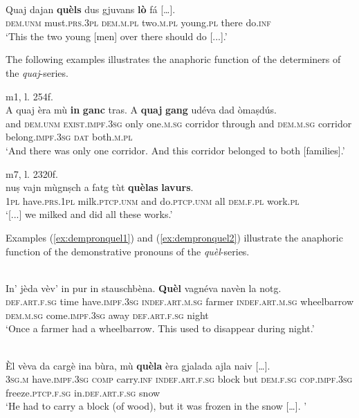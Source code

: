 \ea
\label{ex:quaj:anaph2}
\\
\gll Quaj dajan \textbf{quèls} dus gjuvans \textbf{lò} fá […].\\
    \textsc{dem.unm} must.\textsc{prs.3pl} \textsc{dem.m.pl} two.\textsc{m.pl} young.\textsc{pl} there do.\textsc{inf}\\
\glt `This the two young [men] over there should do [...].'
\z

The following examples illustrates the anaphoric function of the determiners of the \textit{quaj}-series.

\ea
\label{}
 {m1, l. 254f.}\\
\gll A quaj èra mù \textbf{in} \textbf{ganc} tras. A \textbf{quaj} \textbf{gang} udéva dad òmaṣdús.\\
and \textsc{dem.unm} \textsc{exist.impf.3sg} only one.\textsc{m.sg} corridor through and \textsc{dem.m.sg} corridor belong.\textsc{impf.3sg} \textsc{dat} both.\textsc{m.pl}\\
\glt ‘And there was only one corridor. And this corridor belonged to both [families].’
\z

\ea
\label{}
 {m7, l. 2320f.}\\
\gll [...] nuṣ vajn mùgnṣch a fatg tùt \textbf{quèlas} \textbf{lavurs}.\\
{} \textsc{1pl} have.\textsc{prs.1pl} milk.\textsc{ptcp.unm} and do.\textsc{ptcp.unm} all \textsc{dem.f.pl} work.\textsc{pl}\\
\glt `[...] we milked and did all these works.'
\z

Examples (\ref{ex:dempronquel1}) and (\ref{ex:dempronquel2}) illustrate the anaphoric function of the demonstrative pronouns of the \textit{quèl}-series.

\ea
\label{ex:dempronquel1}
\\
\gll    In' jèda vèv’ in pur in stauschbèna. \textbf{Quèl} vagnéva navèn la notg.\\
     \textsc{def.art.f.sg} time have.\textsc{impf.3sg} \textsc{indef.art.m.sg} farmer \textsc{indef.art.m.sg} wheelbarrow \textsc{dem.m.sg} come.\textsc{impf.3sg} away \textsc{def.art.f.sg} night\\
\glt `Once a farmer had a wheelbarrow. This used to disappear during night.'
\z

\ea\label{ex:dempronquel2}
\\
\gll    Èl vèva da cargè ina bùra, mù \textbf{quèla} èra gjalada ajla naiv […].\\
    \textsc{3sg.m} have.\textsc{impf.3sg} \textsc{comp} carry.\textsc{inf} \textsc{indef.art.f.sg} block but \textsc{dem.f.sg} \textsc{cop.impf.3sg} freeze.\textsc{ptcp.f.sg} in.\textsc{def.art.f.sg} snow\\
\glt `He had to carry a block (of wood), but it was frozen in the snow […]. '
\z

